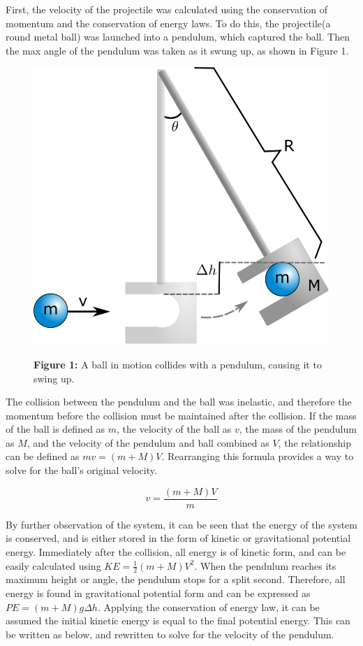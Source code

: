 \documentclass[11pt]{article}
\begin{document}
First, the velocity of the projectile was calculated using the
conservation of momentum and the conservation of energy laws. To do
this, the projectile(a round metal ball) was launched into a pendulum,
which captured the ball. Then the max angle of the pendulum was taken as
it swung up, as shown in Figure 1. 
\begin{figure}
\begin{center}
 \includegraphics[scale=0.4]{Part1Diagram.png}
 
\textbf{Figure 1:} A ball in motion collides with a pendulum, causing it to swing up.
\end{center}
\end{figure}
The collision between the pendulum and the ball was inelastic, and
therefore the momentum before the collision must be maintained after the
collision. If the mass of the ball is defined as \(m\), the velocity of
the ball as \(v\), the mass of the pendulum as \(M\), and the velocity
of the pendulum and ball combined as \(V\), the relationship can be
defined as \(mv=(m + M)V\). Rearranging this formula provides a way to
solve for the ball's original velocity.

\begin{equation}
v = \frac {(m + M)V}{m}
\end{equation}

By further observation of the system, it can be seen that the energy of
the system is conserved, and is either stored in the form of kinetic or
gravitational potential energy. Immediately after the collision, all
energy is of kinetic form, and can be easily calculated using
\(KE = \frac{1}{2}(m + M)V^2\). When the pendulum reaches its maximum
height or angle, the pendulum stops for a split second. Therefore, all
energy is found in gravitational potential form and can be expressed as
\(PE=(m + M)g\Delta h\). Applying the conservation of energy law, it can
be assumed the initial kinetic energy is equal to the final potential
energy. This can be written as below, and rewritten to solve for the
velocity of the pendulum.
\end{document}
